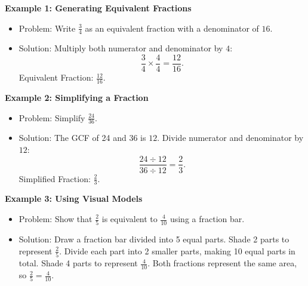 \documentclass[12pt]{article}
\begin{document}
\begin{tcolorbox}[colframe=black!60, colback=white, 
coltitle=black, colbacktitle=black!15, fonttitle=\bfseries\Large, 
title=Examples, halign title=center, left=10pt, right=10pt, top=10pt, bottom=15pt]
\textbf{Example 1: Generating Equivalent Fractions}
\begin{itemize}
    \item Problem: Write \( \frac{3}{4} \) as an equivalent fraction with a denominator of \( 16 \).
    \item Solution:
    Multiply both numerator and denominator by \( 4 \):
    \[
    \frac{3}{4} \times \frac{4}{4} = \frac{12}{16}.
    \]
    Equivalent Fraction: \( \frac{12}{16} \).
\end{itemize}

\textbf{Example 2: Simplifying a Fraction}
\begin{itemize}
    \item Problem: Simplify \( \frac{24}{36} \).
    \item Solution:
    The GCF of 24 and 36 is \( 12 \). Divide numerator and denominator by \( 12 \):
    \[
    \frac{24 \div 12}{36 \div 12} = \frac{2}{3}.
    \]
    Simplified Fraction: \( \frac{2}{3} \).
\end{itemize}

\textbf{Example 3: Using Visual Models}
\begin{itemize}
    \item Problem: Show that \( \frac{2}{5} \) is equivalent to \( \frac{4}{10} \) using a fraction bar.
    \item Solution:
    Draw a fraction bar divided into 5 equal parts. Shade 2 parts to represent \( \frac{2}{5} \). Divide each part into 2 smaller parts, making 10 equal parts in total. Shade 4 parts to represent \( \frac{4}{10} \). Both fractions represent the same area, so \( \frac{2}{5} = \frac{4}{10} \). \vspace{1cm}
\end{itemize}
\end{tcolorbox}
\end{document}

